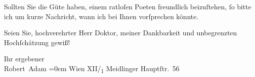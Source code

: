 \pstart
           Sollten Sie die Güte haben, einem ratloſen Poeten freundlich beizuſtehen,{ }ſo bitte
               ich um kurze Nachricht, wann ich bei Ihnen vorſprechen könnte.\pend
           
\pstart
           Seien Sie, hochverehrter Herr Doktor, meiner Dankbarkeit und unbegrenzten
               Hochſchätzung gewiß!\pend
           
\pstart
           Ihr ergebener{\\[\baselineskip]}\spacefill\mbox{Robert Adam}\pend
           \leftskip=0em{}
\pstart
           \noindent{}Wien XII/\textsubscript{1} Meidlinger
                     Hauptſtr. 56\pend
           \endnumbering{}  \newcommand{\dateiname}{L01972}\newcommand{\titel}{Robert Adam an Arthur Schnitzler, 29. 10. 1910}\newcommand{\editorInnen}{Martin Anton Müller und Gerd-Hermann Susen}
